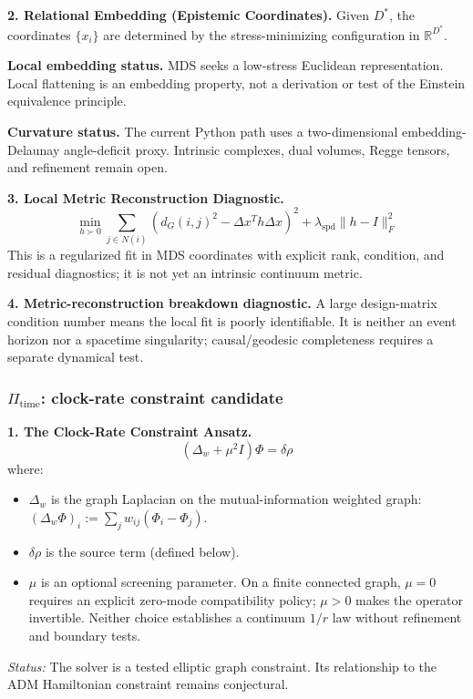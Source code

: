 \documentclass[reprint, amsmath, amssymb, aps, prd]{revtex4-2}
\begin{document}
\textbf{2. Relational Embedding (Epistemic Coordinates).} Given $D^*$, the coordinates $\{x_i\}$ are determined by the stress-minimizing configuration in $\mathbb{R}^{D^*}$. 

\textbf{Local embedding status.} MDS seeks a low-stress Euclidean representation. Local flattening is an embedding property, not a derivation or test of the Einstein equivalence principle.

\textbf{Curvature status.} The current Python path uses a two-dimensional embedding-Delaunay angle-deficit proxy. Intrinsic complexes, dual volumes, Regge tensors, and refinement remain open.

\textbf{3. Local Metric Reconstruction Diagnostic.}
\begin{equation}
\min_{h \succ 0} \sum_{j \in N(i)} \left( d_G(i,j)^2 - \Delta x^T h \Delta x \right)^2  +  \lambda_{\text{spd}} \| h - I \|_F^2
\end{equation}
This is a regularized fit in MDS coordinates with explicit rank, condition, and residual diagnostics; it is not yet an intrinsic continuum metric.

\textbf{4. Metric-reconstruction breakdown diagnostic.} A large design-matrix condition number means the local fit is poorly identifiable. It is neither an event horizon nor a spacetime singularity; causal/geodesic completeness requires a separate dynamical test.

\subsubsection{\texorpdfstring{$\Pi_{\text{time}}$}{Pi\_time}: clock-rate constraint candidate}
\textbf{1. The Clock-Rate Constraint Ansatz.}
\begin{equation}
(\Delta_w + \mu^2 I) \Phi = \delta\rho
\end{equation}
where:
\begin{itemize}
    \item $\Delta_w$ is the graph Laplacian on the mutual-information weighted graph: $(\Delta_w \Phi)_i := \sum_j w_{ij}(\Phi_i - \Phi_j)$.
    \item $\delta\rho$ is the source term (defined below).
    \item $\mu$ is an optional screening parameter. On a finite connected graph, $\mu=0$ requires an explicit zero-mode compatibility policy; $\mu>0$ makes the operator invertible. Neither choice establishes a continuum $1/r$ law without refinement and boundary tests.
\end{itemize}
\textit{Status:} The solver is a tested elliptic graph constraint. Its relationship to the ADM Hamiltonian constraint remains conjectural.
\end{document}
